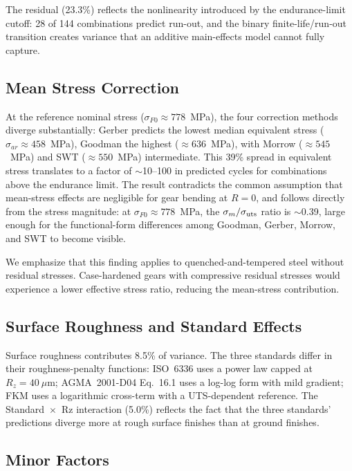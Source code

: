 \documentclass[12pt,a4paper]{article}
\begin{document}
The residual (23.3\%) reflects the nonlinearity introduced by the
endurance-limit cutoff: 28 of 144 combinations predict run-out, and the
binary finite-life/run-out transition creates variance that an additive
main-effects model cannot fully capture.

\subsection{Mean Stress Correction}

At the reference nominal stress ($\sigma_{F0} \approx 778$~MPa), the
four correction methods diverge substantially: Gerber predicts the
lowest median equivalent stress ($\sigma_{ar} \approx 458$~MPa),
Goodman the highest ($\approx 636$~MPa), with Morrow ($\approx 545$~MPa)
and SWT ($\approx 550$~MPa) intermediate. This 39\% spread in
equivalent stress translates to a factor of $\sim$10--100 in predicted
cycles for combinations above the endurance limit. The result contradicts
the common assumption that mean-stress effects are negligible for gear
bending at $R=0$, and follows directly from the stress magnitude: at
$\sigma_{F0} \approx 778$~MPa, the $\sigma_m/\sigma_{\rm uts}$ ratio
is $\sim$0.39, large enough for the functional-form differences among
Goodman, Gerber, Morrow, and SWT to become visible.

We emphasize that this finding applies to quenched-and-tempered steel
without residual stresses. Case-hardened gears with compressive residual
stresses would experience a lower effective stress ratio, reducing the
mean-stress contribution.

\subsection{Surface Roughness and Standard Effects}

Surface roughness contributes 8.5\% of variance. The three standards
differ in their roughness-penalty functions: ISO~6336 uses a power law
capped at $R_z=40~\mu$m; AGMA~2001-D04 Eq.~16.1 uses a log-log form
with mild gradient; FKM uses a logarithmic cross-term with a UTS-dependent
reference. The Standard~$\times$~Rz interaction (5.0\%) reflects the
fact that the three standards' predictions diverge more at rough surface
finishes than at ground finishes.

\subsection{Minor Factors}
\end{document}
